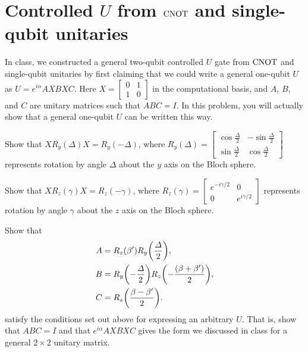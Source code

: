 \documentclass{../phys084}
\begin{document}
\begin{solution}
  \begin{problems}
  \item
  \item
  \item
  \end{problems}
\end{solution}

\section{Controlled \(U\) from \(\operatorname{CNOT}\) and single-qubit unitaries}

\begin{exercise}
  In class, we constructed a general two-qubit controlled \(U\) gate
  from \(\operatorname{CNOT}\) and single-qubit unitaries by first claiming that we
  could write a general one-qubit \(U\) as \(U = e^{i\alpha}AXBXC\).
  Here \(X =
  \begin{bmatrix}
    0 & 1 \\ 1 & 0
  \end{bmatrix}
  \) in the computational basis, and \(A\), \(B\), and \(C\) are
  unitary matrices such that \(ABC=I\).  In this problem, you will
  actually show that a general one-qubit \(U\) can be written this
  way.

  \begin{problems}
  \item Show that \(XR_y (\Delta) X = R_y (-\Delta)\), where
    \(R_y(\Delta) =
    \begin{bmatrix}
      \cos \frac \Delta 2 & -\sin \frac \Delta 2 \\
      \sin \frac \Delta 2 &  \cos \frac \Delta 2
    \end{bmatrix}
    \) represents rotation by angle \(\Delta\) about the \(y\) axis on
    the Bloch sphere.

  \item Show that \(XR_z(\gamma)X = R_z(-\gamma)\), where
    \(R_z(\gamma) =
    \begin{bmatrix}
      e^{-i\gamma/2} & 0 \\ 0 & e^{i\gamma/2}
    \end{bmatrix}
    \) represents rotation by angle \(\gamma\) about the \(z\) axis on
    the Bloch sphere.

  \item Show that
    \begin{align*}
      A &= R_z(\beta') R_y \prn*{\frac \Delta 2}, \\
      B &= R_y\prn*{-\frac \Delta 2} R_z\prn*{-\frac{(\beta+\beta')}{2}}, \\
      C &= R_z\prn*{\frac{\beta-\beta'}{2}}.
    \end{align*}
    satisfy the conditions set out above for expressing an arbitrary
    \(U\).  That is, show that \(ABC = I\) and that
    \(e^{i\alpha}AXBXC\) gives the form we discussed in class for a
    general \(2 \times 2\) unitary matrix.
  \end{problems}
\end{exercise}

\begin{solution}
  \begin{problems}
  \item
  \item
  \item
  \end{problems}
\end{solution}
\end{document}
